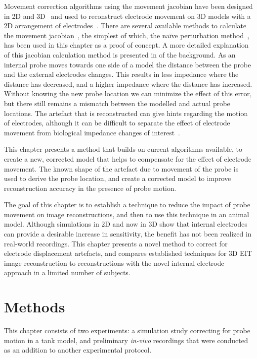 Movement correction algorithms using the movement jacobian have been 
designed in 2D 
and 3D~\parencite{gomez-laberge_direct_2007,soleimani_imaging_2006,gomez-laberge_direct_2008}
and used to reconstruct electrode movement on 3D models with a 2D arrangement 
of electrodes~\parencite{boyle_geophysical_2016}. 
There are several available methods to calculate the movement 
jacobian~\parencite{boyle_methods_2017}, the simplest of which,
the na\"{i}ve perturbation method~\parencite{gomez-laberge_direct_2008},
has been used in this chapter as a proof of concept.  
A more detailed explanation of this jacobian calculation method is presented in 
 of the background.
As an internal probe moves towards one side of a model the distance between the 
probe and the external electrodes changes. This results in less impedance where the distance 
has decreased, and a higher impedance where the distance has increased. Without knowing 
the new probe location we can minimize the effect of this error, but there still remains 
a mismatch between the modelled and actual probe locations. 
The artefact that is reconstructed can give hints regarding the motion of electrodes,
although it can be difficult to separate the effect of electrode movement 
from biological impedance changes of interest~\parencite{boyle_geophysical_2016}. 

This chapter presents a method that builds on current algorithms 
available, to create a new, corrected model
that helps to compensate for the effect of electrode movement.  
The known shape of the artefact due to movement of the probe is used to 
derive the probe location, and create a corrected model to improve 
reconstruction accuracy in the presence of probe motion.

The goal of this chapter is to establish a technique to reduce the impact of probe movement on 
image reconstructions, and then to use this technique in an animal model. 
Although simulations in 2D and now in 3D show that internal electrodes can provide 
a desirable increase in sensitivity, the benefit has not been realized in real-world
recordings. 
This chapter presents a novel method to correct for electrode displacement artefacts, 
and compares established techniques for 3D EIT image reconstruction 
to reconstructions with the novel internal electrode approach in a limited number of 
subjects.

\section{Methods}
This chapter consists of two experiments: a simulation study correcting for probe motion 
in a tank model, and preliminary \emph{in-vivo} recordings that were conducted as an 
addition to another experimental protocol. 

